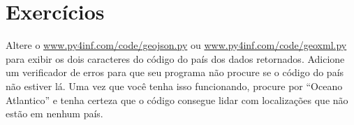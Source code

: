 \section{Exercícios}

\begin{ex}
Altere o
\url{www.py4inf.com/code/geojson.py} ou
\url{www.py4inf.com/code/geoxml.py} para exibir os
dois caracteres do código do país dos dados retornados.
Adicione um verificador de erros para que seu programa
não procure se o código do país não estiver lá. Uma vez
que você tenha isso funcionando, procure por 
``Oceano Atlantico'' e tenha certeza que o código consegue
lidar com localizações que não estão em nenhum país.
\end{ex}

